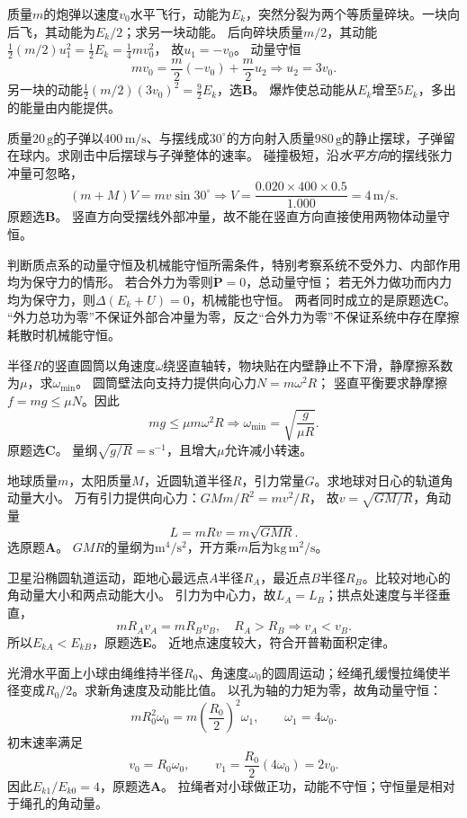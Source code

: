 \problemtext 质量$m$的炮弹以速度$v_0$水平飞行，动能为$E_k$，突然分裂为两个等质量碎块。一块向后飞，其动能为$E_k/2$；求另一块动能。
\workings
后向碎块质量$m/2$，其动能$\frac12(m/2)u_1^2=\frac12 E_k=\frac14 m v_0^2$，
故$u_1=-v_0$。
动量守恒
\[
m v_0=\frac m2(-v_0)+\frac m2u_2
\Longrightarrow u_2=3v_0.
\]
另一块的动能$\frac12(m/2)(3v_0)^2=\frac92E_k$，选\textbf{B}。
\crosscheck 爆炸使总动能从$E_k$增至$5E_k$，多出的能量由内能提供。

\problemtext 质量$20\,\mathrm g$的子弹以$400\,\mathrm{m/s}$、与摆线成$30^\circ$的方向射入质量$980\,\mathrm g$的静止摆球，子弹留在球内。求刚击中后摆球与子弹整体的速率。
\workings
碰撞极短，沿\emph{水平方向}的摆线张力冲量可忽略，
\[
(m+M)V=m v\sin30^\circ
\Longrightarrow
\boxed{V=\frac{0.020\times400\times0.5}{1.000}
=4\,\mathrm{m/s}}.
\]
原题选\textbf{B}。
\crosscheck 竖直方向受摆线外部冲量，故不能在竖直方向直接使用两物体动量守恒。

\problemtext 判断质点系的动量守恒及机械能守恒所需条件，特别考察系统不受外力、内部作用均为保守力的情形。
\workings
若合外力为零则$\dot{\bm P}=0$，总动量守恒；
若无外力做功而内力均为保守力，则$\Delta(E_k+U)=0$，机械能也守恒。
两者同时成立的是原题选\textbf{C}。
\crosscheck “外力总功为零”不保证外部合冲量为零，反之“合外力为零”不保证系统中存在摩擦耗散时机械能守恒。

\problemtext 半径$R$的竖直圆筒以角速度$\omega$绕竖直轴转，物块贴在内壁静止不下滑，静摩擦系数为$\mu$，求$\omega_{\min}$。
\workings
圆筒壁法向支持力提供向心力$N=m\omega^2R$；
竖直平衡要求静摩擦$f=mg\le\mu N$。因此
\[
mg\le\mu m\omega^2R
\Longrightarrow
\boxed{\omega_{\min}=\sqrt{\frac{g}{\mu R}}}.
\]
原题选\textbf{C}。
\crosscheck 量纲$\sqrt{g/R}=\mathrm{s^{-1}}$，且增大$\mu$允许减小转速。

\problemtext 地球质量$m$，太阳质量$M$，近圆轨道半径$R$，引力常量$G$。求地球对日心的轨道角动量大小。
\workings
万有引力提供向心力：$GMm/R^2=mv^2/R$，
故$v=\sqrt{GM/R}$，角动量
\[
\boxed{L=mRv=m\sqrt{GMR}}.
\]
选原题\textbf{A}。
\crosscheck $GMR$的量纲为$\mathrm{m^4/s^2}$，开方乘$m$后为$\mathrm{kg\,m^2/s}$。

\problemtext 卫星沿椭圆轨道运动，距地心最远点$A$半径$R_A$，最近点$B$半径$R_B$。比较对地心的角动量大小和两点动能大小。
\workings
引力为中心力，故$L_A=L_B$；拱点处速度与半径垂直，
\[
mR_Av_A=mR_Bv_B,\quad R_A>R_B
\Longrightarrow v_A<v_B.
\]
所以$E_{kA}<E_{kB}$，原题选\textbf{E}。
\crosscheck 近地点速度较大，符合开普勒面积定律。

\problemtext 光滑水平面上小球由绳维持半径$R_0$、角速度$\omega_0$的圆周运动；经绳孔缓慢拉绳使半径变成$R_0/2$。求新角速度及动能比值。
\workings
以孔为轴的力矩为零，故角动量守恒：
\[
mR_0^2\omega_0=m\left(\frac{R_0}{2}\right)^2\omega_1,
\qquad
\boxed{\omega_1=4\omega_0}.
\]
初末速率满足
\[
v_0=R_0\omega_0,\qquad
v_1=\frac{R_0}{2}(4\omega_0)=2v_0.
\]
因此$E_{k1}/E_{k0}=4$，原题选\textbf{A}。
\crosscheck 拉绳者对小球做正功，动能不守恒；守恒量是相对于绳孔的角动量。
